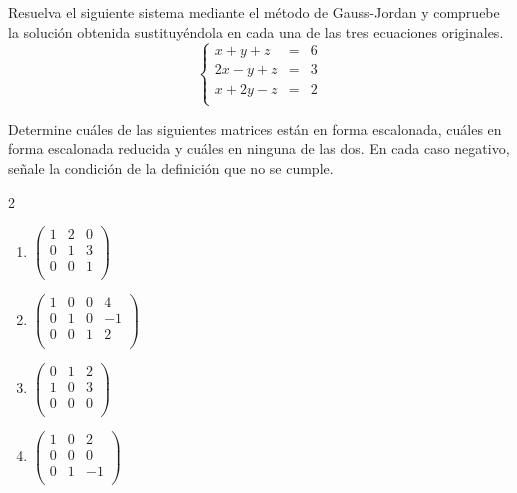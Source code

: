 \begin{prob} Resuelva el siguiente sistema mediante el método de Gauss-Jordan y compruebe la solución obtenida sustituyéndola en cada una de las tres ecuaciones originales.
\[
\left\lbrace \begin{array}{ccc}
x+y+z&=&6\\
2x-y+z&=&3\\
x+2y-z&=&2\\
\end{array} \right.
\]
\end{prob}

\begin{prob} Determine cuáles de las siguientes matrices están en forma escalonada, cuáles en forma escalonada reducida y cuáles en ninguna de las dos. En cada caso negativo, señale la condición de la definición que no se cumple.
\begin{multicols}{2}
\begin{enumerate}[$a)$]
\item $\left( \begin{array}{ccc}
1&2&0\\
0&1&3\\
0&0&1\\
\end{array} \right)$

\item $\left( \begin{array}{cccc}
1&0&0&4\\
0&1&0&-1\\
0&0&1&2\\
\end{array} \right)$

\item $\left( \begin{array}{ccc}
0&1&2\\
1&0&3\\
0&0&0\\
\end{array} \right)$

\item $\left( \begin{array}{ccc}
1&0&2\\
0&0&0\\
0&1&-1\\
\end{array} \right)$
\end{enumerate}
\end{multicols}
\end{prob}

